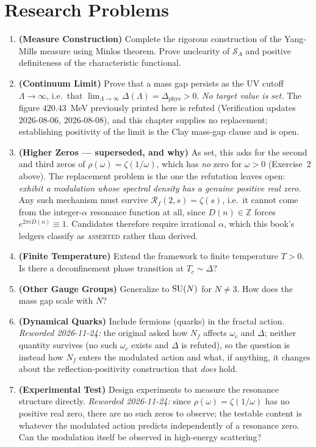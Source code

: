 \section*{Research Problems}

\begin{enumerate}
\item \textbf{(Measure Construction)} Complete the rigorous construction of the Yang-Mills measure using Minlos theorem. Prove nuclearity of $\mathcal{S}_A$ and positive definiteness of the characteristic functional.

\item \textbf{(Continuum Limit)} Prove that a mass gap persists as the UV
cutoff $\Lambda \to \infty$, i.e.\ that
$\lim_{\Lambda \to \infty}\Delta(\Lambda) = \Delta_{\text{phys}} > 0$. \emph{No
target value is set.} The figure $420.43$~MeV previously printed here is
refuted (Verification updates 2026-08-06, 2026-08-08), and this chapter
supplies no replacement; establishing positivity of the limit is the Clay
mass-gap clause and is open.

\item \textbf{(Higher Zeros --- superseded, and why)} As set, this asks
for the second and third zeros of $\rho(\omega) = \zeta(1/\omega)$, which has
\emph{no} zero for $\omega > 0$ (Exercise~2 above). The replacement problem is
the one the refutation leaves open: \emph{exhibit a modulation whose spectral
density has a genuine positive real zero.} Any such mechanism must survive
$\mathcal{R}_f(2,s) = \zeta(s)$, i.e.\ it cannot come from the integer-$\alpha$
resonance function at all, since $D(n) \in \mathbb{Z}$ forces
$e^{2\pi i D(n)} \equiv 1$. Candidates therefore require irrational $\alpha$,
which this book's ledgers classify as \textsc{asserted} rather than derived.

\item \textbf{(Finite Temperature)} Extend the framework to finite temperature $T > 0$. Is there a deconfinement phase transition at $T_c \sim \Delta$?

\item \textbf{(Other Gauge Groups)} Generalize to $\mathrm{SU}(N)$ for $N \neq 3$. How does the mass gap scale with $N$?

\item \textbf{(Dynamical Quarks)} Include fermions (quarks) in the
fractal action. \emph{Reworded 2026-11-24:} the original asked how $N_f$ affects
$\omega_c$ and $\Delta$; neither quantity survives (no such $\omega_c$ exists
and $\Delta$ is refuted), so the question is instead how $N_f$ enters the
modulated action and what, if anything, it changes about the
reflection-positivity construction that \emph{does} hold.

\item \textbf{(Experimental Test)} Design experiments to measure the
resonance structure directly. \emph{Reworded 2026-11-24:} since
$\rho(\omega) = \zeta(1/\omega)$ has no positive real zero, there are no such
zeros to observe; the testable content is whatever the modulated action predicts
independently of a resonance zero. Can the modulation itself be observed in high-energy scattering?
\end{enumerate}
